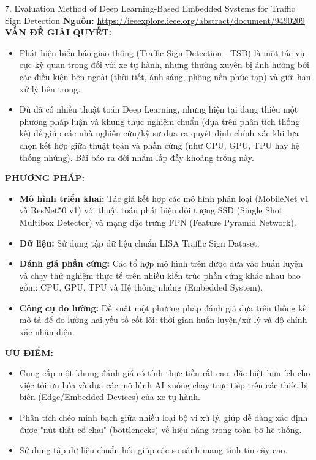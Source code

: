 \documentclass[12pt,a4paper]{article}
\newcommand{\subheading}[1]{\vspace{0.3cm}\noindent\textbf{\textcolor{primary}{\MakeUppercase{#1}:}}\par\vspace{0.1cm}}
\begin{document}
\begin{paperbox}{7. Evaluation Method of Deep Learning-Based Embedded Systems for Traffic Sign Detection}
    \textbf{Nguồn:} \url{https://ieeexplore.ieee.org/abstract/document/9490209}\\

    \subheading{Vấn đề giải quyết}
    \begin{itemize}
        \item Phát hiện biển báo giao thông (Traffic Sign Detection - TSD) là một tác vụ cực kỳ quan trọng đối với xe tự hành, nhưng thường xuyên bị ảnh hưởng bởi các điều kiện bên ngoài (thời tiết, ánh sáng, phông nền phức tạp) và giới hạn xử lý bên trong.
        \item Dù đã có nhiều thuật toán Deep Learning, nhưng hiện tại đang thiếu một phương pháp luận và khung thực nghiệm chuẩn (dựa trên phân tích thống kê) để giúp các nhà nghiên cứu/kỹ sư đưa ra quyết định chính xác khi lựa chọn kết hợp giữa thuật toán và phần cứng (như CPU, GPU, TPU hay hệ thống nhúng). Bài báo ra đời nhằm lấp đầy khoảng trống này.
    \end{itemize}

    \subheading{Phương pháp}
    \begin{itemize}
        \item \textbf{Mô hình triển khai:} Tác giả kết hợp các mô hình phân loại (MobileNet v1 và ResNet50 v1) với thuật toán phát hiện đối tượng SSD (Single Shot Multibox Detector) và mạng đặc trưng FPN (Feature Pyramid Network).
        \item \textbf{Dữ liệu:} Sử dụng tập dữ liệu chuẩn LISA Traffic Sign Dataset.
        \item \textbf{Đánh giá phần cứng:} Các tổ hợp mô hình trên được đưa vào huấn luyện và chạy thử nghiệm thực tế trên nhiều kiến trúc phần cứng khác nhau bao gồm: CPU, GPU, TPU và Hệ thống nhúng (Embedded System).
        \item \textbf{Công cụ đo lường:} Đề xuất một phương pháp đánh giá dựa trên thống kê mô tả để đo lường hai yếu tố cốt lõi: thời gian huấn luyện/xử lý và độ chính xác nhận diện.
    \end{itemize}

    \subheading{Ưu điểm}
    \begin{itemize}
        \item Cung cấp một khung đánh giá có tính thực tiễn rất cao, đặc biệt hữu ích cho việc tối ưu hóa và đưa các mô hình AI xuống chạy trực tiếp trên các thiết bị biên (Edge/Embedded Devices) của xe tự hành.
        \item Phân tích chéo minh bạch giữa nhiều loại bộ vi xử lý, giúp dễ dàng xác định được "nút thắt cổ chai" (bottlenecks) về hiệu năng trong toàn bộ hệ thống.
        \item Sử dụng tập dữ liệu chuẩn hóa giúp các so sánh mang tính tin cậy cao.
    \end{itemize}


\end{paperbox}
\end{document}
